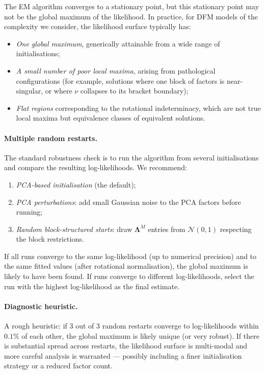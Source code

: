 \documentclass[11pt, a4paper, oneside]{article}
\newcommand{\mL}{\boldsymbol{\Lambda}}
\begin{document}
The EM algorithm converges to a stationary point, but this stationary
point may not be the global maximum of the likelihood. In practice,
for DFM models of the complexity we consider, the likelihood surface
typically has:

\begin{itemize}[leftmargin=1.5em, itemsep=3pt]
    \item \emph{One global maximum}, generically attainable from a
          wide range of initialisations;
    \item \emph{A small number of poor local maxima}, arising from
          pathological configurations (for example, solutions where
          one block of factors is near-singular, or where $\nu$
          collapses to its bracket boundary);
    \item \emph{Flat regions} corresponding to the rotational
          indeterminacy,
          which are not true local maxima but equivalence classes of
          equivalent solutions.
\end{itemize}

\paragraph{Multiple random restarts.}
The standard robustness check is to run the algorithm from several
initialisations and compare the resulting log-likelihoods. We
recommend:
\begin{enumerate}[leftmargin=1.5em, itemsep=2pt]
    \item \emph{PCA-based initialisation} (the default);
    \item \emph{PCA perturbations}: add small Gaussian noise to the
          PCA factors before running;
    \item \emph{Random block-structured starts}: draw
          $\mL^M$ entries from $\mathcal{N}(0, 1)$
          respecting the block restrictions.
\end{enumerate}
If all runs converge to the same log-likelihood (up to numerical
precision) and to the same fitted values (after rotational
normalisation), the global maximum is likely to have been found. If
runs converge to different log-likelihoods, select the run with the
highest log-likelihood as the final estimate.

\paragraph{Diagnostic heuristic.}
A rough heuristic: if 3 out of 3 random restarts converge to
log-likelihoods within $0.1\%$ of each other, the global maximum is
likely unique (or very robust). If there is substantial spread across
restarts, the likelihood surface is multi-modal and more careful
analysis is warranted — possibly including a finer initialisation
strategy or a reduced factor count.
\end{document}
